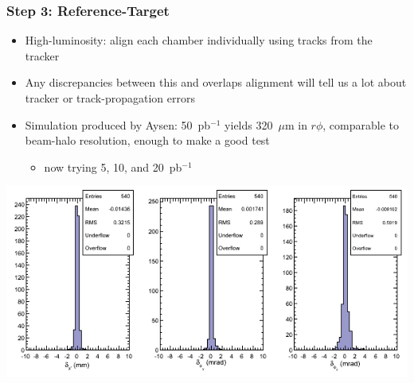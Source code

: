 \documentclass[compress]{beamer}
\begin{document}
\begin{frame}
\frametitle{Step 3: Reference-Target}

\begin{itemize}
\item High-luminosity: align each chamber individually using tracks from the tracker

\item Any discrepancies between this and overlaps alignment will tell us a lot about tracker or track-propagation errors

\item Simulation produced by Aysen: 50~pb$^{-1}$ yields 320~$\mu$m in $r\phi$, comparable to beam-halo resolution, enough to make a good test
\begin{itemize}
\item now trying 5, 10, and 20~pb$^{-1}$
\end{itemize}
\end{itemize}

\begin{center}
\includegraphics[width=0.8\linewidth]{only3_CSC.png}
\end{center}
\end{frame}


\end{document}
